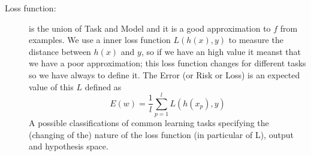 \begin{description}
    \item [Loss function: ] is the union of Task and Model and it is a good approximation to $f$ from examples.\newline
                            We use a inner loss function $L(h(x), y)$ to measure the distance between $h(x)$ and $y$,
                            so if we have an high value it meanst that we have a poor approximation; this loss 
                            function changes for different tasks so we have always to define it.\newline
                            The Error (or Risk or Loss) is an expected value of this $L$ defined as 
                            \[ E(w) = \frac{1}{l} \sum _{p=1}^l L(h(x_p), y) \]
                            A possible classifications of common learning tasks specifying the 
                            (changing of the) nature of the loss function (in particular of L),
                            output and hypothesis space.
                            

\end{description}
